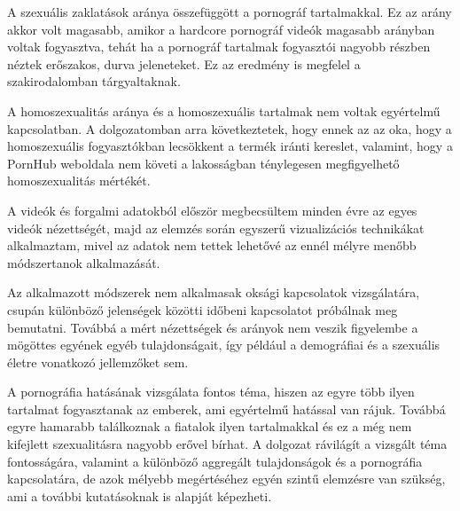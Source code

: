 \documentclass[12pt,a4paper]{article}
\begin{document}
A szexuális zaklatások aránya összefüggött a pornográf tartalmakkal. Ez az arány akkor volt magasabb, amikor a hardcore pornográf videók magasabb arányban voltak fogyasztva, tehát ha a pornográf tartalmak fogyasztói nagyobb részben néztek erőszakos, durva jeleneteket. Ez az eredmény is megfelel a szakirodalomban tárgyaltaknak.

A homoszexualitás aránya és a homoszexuális tartalmak nem voltak egyértelmű kapcsolatban. A dolgozatomban arra következtetek, hogy ennek az az oka, hogy a homoszexuális fogyasztókban lecsökkent a termék iránti kereslet, valamint, hogy a PornHub weboldala nem követi a lakosságban ténylegesen megfigyelhető homoszexualitás mértékét.

A videók és forgalmi adatokból először megbecsültem minden évre az egyes videók nézettségét, majd az elemzés során egyszerű vizualizációs technikákat alkalmaztam, mivel az adatok nem tettek lehetővé az ennél mélyre menőbb módszertanok alkalmazását.

Az alkalmazott módszerek nem alkalmasak oksági kapcsolatok vizsgálatára, csupán különböző jelenségek közötti időbeni kapcsolatot próbálnak meg bemutatni. Továbbá a mért nézettségek és arányok nem veszik figyelembe a mögöttes egyének egyéb tulajdonságait, így például a demográfiai és a szexuális életre vonatkozó jellemzőket sem.

A pornográfia hatásának vizsgálata fontos téma, hiszen az egyre több ilyen tartalmat fogyasztanak az emberek, ami egyértelmű hatással van rájuk. Továbbá egyre hamarabb találkoznak a fiatalok ilyen tartalmakkal és ez a még nem kifejlett szexualitásra nagyobb erővel bírhat. A dolgozat rávilágít a vizsgált téma fontosságára, valamint a különböző aggregált tulajdonságok és a pornográfia kapcsolatára, de azok mélyebb megértéséhez egyén szintű elemzésre van szükség, ami a további kutatásoknak is alapját képezheti.

\pagebreak


\end{document}
